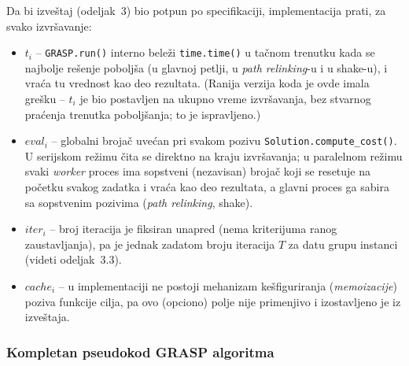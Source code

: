 \documentclass[12pt,a4paper]{article}
\begin{document}
Da bi izveštaj (odeljak~3) bio potpun po specifikaciji, implementacija
prati, za svako izvršavanje:
\begin{itemize}
  \item $t_i$ -- \texttt{GRASP.run()} interno beleži \texttt{time.time()}
    u tačnom trenutku kada se najbolje rešenje poboljša (u glavnoj petlji,
    u \textit{path relinking}-u i u shake-u), i vraća tu vrednost kao deo
    rezultata. (Ranija verzija koda je ovde imala grešku -- $t_i$ je bio
    postavljen na ukupno vreme izvršavanja, bez stvarnog praćenja trenutka
    poboljšanja; to je ispravljeno.)
  \item $eval_i$ -- globalni brojač uvećan pri svakom pozivu
    \texttt{Solution.compute\_cost()}. U serijskom režimu čita se direktno
    na kraju izvršavanja; u paralelnom režimu svaki \textit{worker} proces
    ima sopstveni (nezavisan) brojač koji se resetuje na početku svakog
    zadatka i vraća kao deo rezultata, a glavni proces ga sabira sa
    sopstvenim pozivima (\textit{path relinking}, shake).
  \item $iter_i$ -- broj iteracija je fiksiran unapred (nema kriterijuma
    ranog zaustavljanja), pa je jednak zadatom broju iteracija $T$ za datu
    grupu instanci (videti odeljak~3.3).
  \item $cache_i$ -- u implementaciji ne postoji mehanizam kešfiguriranja
    (\textit{memoizacije}) poziva funkcije cilja, pa ovo (opciono) polje
    nije primenjivo i izostavljeno je iz izveštaja.
\end{itemize}

\subsubsection{Kompletan pseudokod GRASP algoritma}
\end{document}
